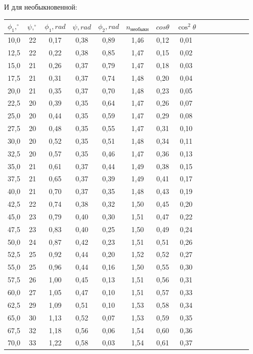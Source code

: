 \documentclass[14pt]{article}
\begin{document}
\newpage
И для необыкновенной:
\begin{center}
\begin{tabular}{|c|c|c|c|c|c|c|c|c|c|c|c|c|c|c|}
\hline
$\phi_1, ^\circ$	&	$\psi, ^\circ$	&	$\phi_1, rad$	&	$\psi, rad$	&	$\phi_2, rad$	&	$n_\text{необыкн}$	&	$cos\theta$	&	$\cos^2\theta$	\\
\hline
10,0&22&0,17&0,38&0,89&1,46&0,12&0,01\\
\hline
12,5&22&0,22&0,38&0,85&1,47&0,15&0,02\\
\hline
15,0&21&0,26&0,37&0,79&1,47&0,18&0,03\\
\hline
17,5&21&0,31&0,37&0,74&1,48&0,20&0,04\\
\hline
20,0&21&0,35&0,37&0,70&1,48&0,23&0,05\\
\hline
22,5&20&0,39&0,35&0,64&1,47&0,26&0,07\\
\hline
25,0&20&0,44&0,35&0,59&1,47&0,29&0,08\\
\hline
27,5&20&0,48&0,35&0,55&1,47&0,31&0,10\\
\hline
30,0&20&0,52&0,35&0,51&1,48&0,34&0,11\\
\hline
32,5&20&0,57&0,35&0,46&1,47&0,36&0,13\\
\hline
35,0&21&0,61&0,37&0,44&1,49&0,38&0,15\\
\hline
37,5&21&0,65&0,37&0,39&1,49&0,41&0,17\\
\hline
40,0&21&0,70&0,37&0,35&1,48&0,43&0,19\\
\hline
42,5&22&0,74&0,38&0,32&1,50&0,45&0,20\\
\hline
45,0&23&0,79&0,40&0,30&1,51&0,47&0,22\\
\hline
47,5&23&0,83&0,40&0,25&1,50&0,49&0,24\\
\hline
50,0&24&0,87&0,42&0,23&1,51&0,51&0,26\\
\hline
52,5&25&0,92&0,44&0,20&1,52&0,52&0,27\\
\hline
55,0&25&0,96&0,44&0,16&1,50&0,55&0,30\\
\hline
57,5&26&1,00&0,45&0,13&1,51&0,56&0,31\\
\hline
60,0&27&1,05&0,47&0,10&1,51&0,57&0,33\\
\hline
62,5&29&1,09&0,51&0,10&1,53&0,58&0,34\\
\hline
65,0&30&1,13&0,52&0,07&1,53&0,59&0,35\\
\hline
67,5&32&1,18&0,56&0,06&1,54&0,60&0,36\\
\hline
70,0&33&1,22&0,58&0,03&1,54&0,61&0,37\\
\hline
\end{tabular}
\end{center}
\end{document}
